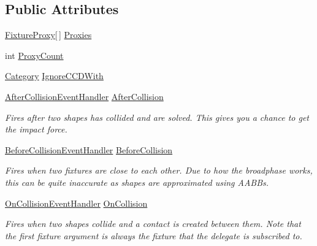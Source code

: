 \subsection*{Public Attributes}
\begin{DoxyCompactItemize}
\item 
\hyperlink{struct_farseer_physics_1_1_dynamics_1_1_fixture_proxy}{Fixture\+Proxy}\mbox{[}$\,$\mbox{]} \hyperlink{class_farseer_physics_1_1_dynamics_1_1_fixture_a68821503e6334e4745612402cb1960b0}{Proxies}
\item 
int \hyperlink{class_farseer_physics_1_1_dynamics_1_1_fixture_af09519aed0c0b3b56239f9ec681ada54}{Proxy\+Count}
\item 
\hyperlink{namespace_farseer_physics_1_1_dynamics_a411fb391cb862402e877a2d3d4e11bef}{Category} \hyperlink{class_farseer_physics_1_1_dynamics_1_1_fixture_a2ec39ce7297a4ad7672d2956cd2eb6bf}{Ignore\+C\+C\+D\+With}
\item 
\hyperlink{namespace_farseer_physics_1_1_dynamics_a035ecfe770afb57ab9c71fa4f491201b}{After\+Collision\+Event\+Handler} \hyperlink{class_farseer_physics_1_1_dynamics_1_1_fixture_a6f2233efd9a1c67f26e33c4973e35efe}{After\+Collision}
\begin{DoxyCompactList}\small\item\em Fires after two shapes has collided and are solved. This gives you a chance to get the impact force. \end{DoxyCompactList}\item 
\hyperlink{namespace_farseer_physics_1_1_dynamics_a14ac50ab47cb11796f6a624587b36cca}{Before\+Collision\+Event\+Handler} \hyperlink{class_farseer_physics_1_1_dynamics_1_1_fixture_a9e73f7e383d0941bcc9ef7fc1bf0ea92}{Before\+Collision}
\begin{DoxyCompactList}\small\item\em Fires when two fixtures are close to each other. Due to how the broadphase works, this can be quite inaccurate as shapes are approximated using A\+A\+B\+Bs. \end{DoxyCompactList}\item 
\hyperlink{namespace_farseer_physics_1_1_dynamics_a7ec118e60eba61920ca0e4252b5b766d}{On\+Collision\+Event\+Handler} \hyperlink{class_farseer_physics_1_1_dynamics_1_1_fixture_a2410f992b5c7b8ac41fa19018d1ff0b3}{On\+Collision}
\begin{DoxyCompactList}\small\item\em Fires when two shapes collide and a contact is created between them. Note that the first fixture argument is always the fixture that the delegate is subscribed to. \end{DoxyCompactList}\item 

\end{DoxyCompactItemize}
